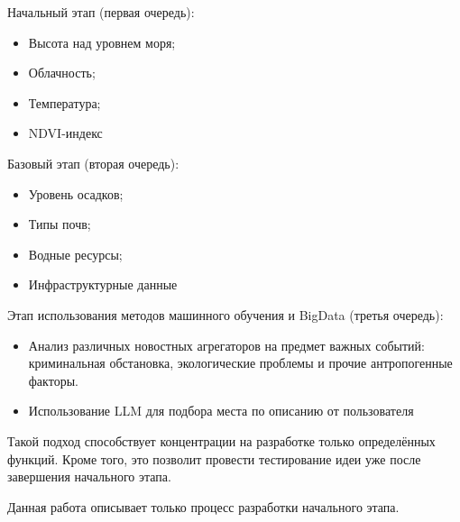 Начальный этап (первая очередь):
\begin{itemize}
	\item Высота над уровнем моря;
	\item Облачность;
	\item Температура;
	\item NDVI-индекс
\end{itemize}

Базовый этап (вторая очередь):
\begin{itemize}
	\item Уровень осадков;
	\item Типы почв;
	\item Водные ресурсы;
	\item Инфраструктурные данные
\end{itemize}

Этап использования методов машинного обучения и BigData (третья очередь):
\begin{itemize}
	\item Анализ различных новостных агрегаторов на предмет важных событий: криминальная обстановка, экологические проблемы и прочие антропогенные факторы.
	\item Использование LLM для подбора места по описанию от пользователя 
\end{itemize}

Такой подход способствует концентрации на разработке только определённых функций.
Кроме того, это позволит провести тестирование идеи уже после завершения начального этапа.

Данная работа описывает только процесс разработки начального этапа.